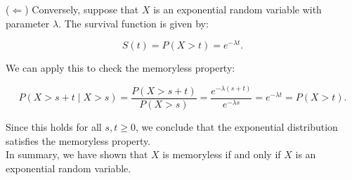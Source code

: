 \begin{solution}
(\(\Leftarrow\)) Conversely, suppose that \( X \) is an exponential random variable with parameter \( \lambda \). The survival function is given by:

\[
S(t) = P(X > t) = e^{-\lambda t}.
\]

We can apply this to check the memoryless property:

\[
P(X > s + t \mid X > s) = \frac{P(X > s+t)}{P(X > s)} = \frac{e^{-\lambda (s+t)}}{e^{-\lambda s}} = e^{-\lambda t} = P(X > t).
\]

Since this holds for all \( s, t \geq 0 \), we conclude that the exponential distribution satisfies the memoryless property.\\

In summary, we have shown that \( X \) is memoryless if and only if \( X \) is an exponential random variable.
\end{solution}
